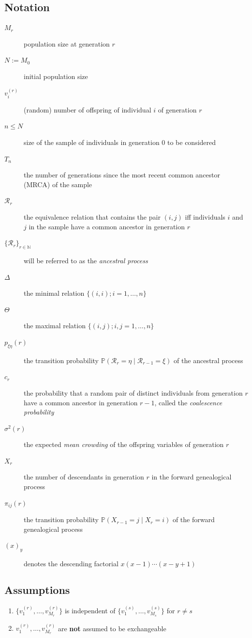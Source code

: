 \documentclass{article}
\newcommand{\PR}{\mathbb{P}}
\begin{document}
\subsection*{Notation}
\begin{description}
\item[$M_r$] population size at generation $r$
\item[$N := M_0$] initial population size
\item[$v_i^{(r)}$] (random) number of offspring of individual $i$ of generation $r$
\item[$n\leq N$] size of the sample of individuals in generation 0 to be considered
\item[$T_n$] the number of generations since the most recent common ancestor (MRCA) of the sample
\item[$\mathcal{R}_r$] the equivalence relation that contains the pair $(i,j)$ iff individuals $i$ and $j$ in the sample have a common ancestor in generation $r$
\item[$\{\mathcal{R}_r\}_{r\in\mathbb{N}}$] will be referred to as the \emph{ancestral process}
\item[$\Delta$] the minimal relation $\{(i,i); i=1,\dots,n\}$
\item[$\Theta$] the maximal relation $\{(i,j); i,j = 1,\dots,n\}$
\item[$p_{\xi\eta}(r)$] the transition probability $\PR(\mathcal{R}_r=\eta\mid\mathcal{R}_{r-1}=\xi)$ of the ancestral process
\item[$c_r$] the probability that a random pair of distinct individuals from generation $r$ have a common ancestor in generation $r-1$, called the \emph{coalescence probability}
\item[$\sigma^2(r)$] the expected \emph{mean crowding} of the offspring variables of generation $r$
\item[$X_r$] the number of descendants in generation $r$ in the forward genealogical process
\item[$\pi_{ij}(r)$] the transition probability $\PR(X_{r-1}=j\mid X_r=i)$ of the forward genealogical process
\item[$(x)_y$] denotes the descending factorial $x(x-1)\cdots(x-y+1)$
\end{description}

\subsection*{Assumptions}
\begin{enumerate}
\item\label{ass:gen_indep} $\{ v_1^{(r)},\dots,v_{M_r}^{(r)} \}$ is independent of $\{ v_1^{(s)},\dots,v_{M_s}^{(s)} \}$ for $r\neq s$
\item\label{ass:non_exch} $ v_1^{(r)},\dots,v_{M_r}^{(r)}$ are \textbf{not} assumed to be exchangeable
\end{enumerate}
\end{document}
